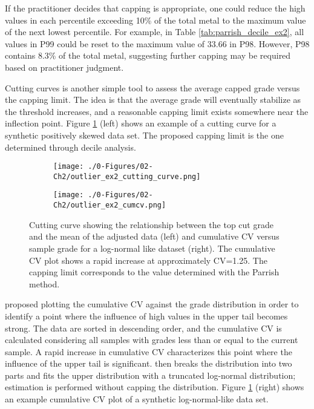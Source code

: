 If the practitioner decides that capping is appropriate, one could reduce the high values in each percentile exceeding 10\% of the total metal to the maximum value of the next lowest percentile. For example, in Table \ref{tab:parrish_decile_ex2}, all values in P99 could be reset to the maximum value of 33.66 in P98. However, P98 contains 8.3\% of the total metal, suggesting further capping may be required based on practitioner judgment.

Cutting curves \citep{roscoe1996cutting,leuangthong2015dealing} is another simple tool to assess the average capped grade versus the capping limit. The idea is that the average grade will eventually stabilize as the threshold increases, and a reasonable capping limit exists somewhere near the inflection point. Figure \ref{fig:cutting_cv} (left) shows an example of a cutting curve for a synthetic positively skewed data set. The proposed capping limit is the one determined through decile analysis.

\begin{figure}[!htb]
    \begin{subfigure}{0.5\textwidth}
        \centering
        \texttt{[image: ./0-Figures/02-Ch2/outlier\_ex2\_cutting\_curve.png]}
    \end{subfigure}
    \begin{subfigure}{0.5\textwidth}
        \centering
        \texttt{[image: ./0-Figures/02-Ch2/outlier\_ex2\_cumcv.png]}
    \end{subfigure}
    \caption{Cutting curve showing the relationship between the top cut grade and the mean of the adjusted data (left) and cumulative \gls{CV} versus sample grade for a log-normal like dataset (right). The cumulative \gls{CV} plot shows a rapid increase at approximately CV=1.25. The capping limit corresponds to the value determined with the Parrish method.}
    \label{fig:cutting_cv}
\end{figure}

\cite{parker1991statistical} proposed plotting the cumulative \gls{CV} against the grade distribution in order to identify a point where the influence of high values in the upper tail becomes strong. The data are sorted in descending order, and the cumulative \gls{CV} is calculated considering all samples with grades less than or equal to the current sample. A rapid increase in cumulative \gls{CV} characterizes this point where the influence of the upper tail is significant. \cite{parker1991statistical} then breaks the distribution into two parts and fits the upper distribution with a truncated log-normal distribution; estimation is performed without capping the distribution. Figure \ref{fig:cutting_cv} (right) shows an example cumulative \gls{CV} plot of a synthetic log-normal-like data set.

